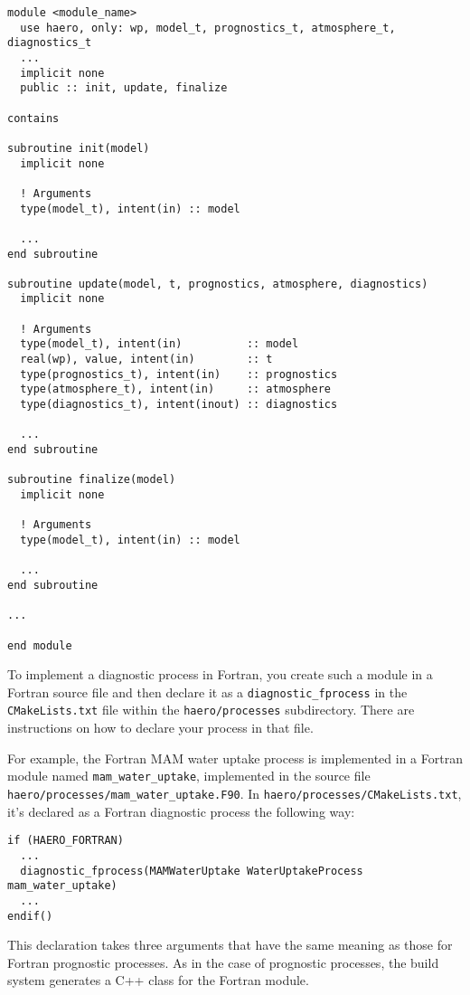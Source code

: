 \begin{lstlisting}
module <module_name>
  use haero, only: wp, model_t, prognostics_t, atmosphere_t, diagnostics_t
  ...
  implicit none
  public :: init, update, finalize

contains

subroutine init(model)
  implicit none

  ! Arguments
  type(model_t), intent(in) :: model

  ...
end subroutine

subroutine update(model, t, prognostics, atmosphere, diagnostics)
  implicit none

  ! Arguments
  type(model_t), intent(in)          :: model
  real(wp), value, intent(in)        :: t
  type(prognostics_t), intent(in)    :: prognostics
  type(atmosphere_t), intent(in)     :: atmosphere
  type(diagnostics_t), intent(inout) :: diagnostics

  ...
end subroutine

subroutine finalize(model)
  implicit none

  ! Arguments
  type(model_t), intent(in) :: model

  ...
end subroutine

...

end module
\end{lstlisting}

To implement a diagnostic process in Fortran, you create such a module in a
Fortran source file and then declare it as a \texttt{diagnostic\_fprocess} in the
\texttt{CMakeLists.txt} file within the \texttt{haero/processes} subdirectory.
There are instructions on how to declare your process in that file.

For example, the Fortran MAM water uptake process is implemented in a Fortran
module named \texttt{mam\_water\_uptake}, implemented in the source file
\texttt{haero/processes/mam\_water\_uptake.F90}. In
\texttt{haero/processes/CMakeLists.txt}, it's declared as a Fortran diagnostic
process the following way:

\begin{lstlisting}
if (HAERO_FORTRAN)
  ...
  diagnostic_fprocess(MAMWaterUptake WaterUptakeProcess mam_water_uptake)
  ...
endif()
\end{lstlisting}

This declaration takes three arguments that have the same meaning as those for
Fortran prognostic processes. As in the case of prognostic processes, the build
system generates a C++ class for the Fortran module.

